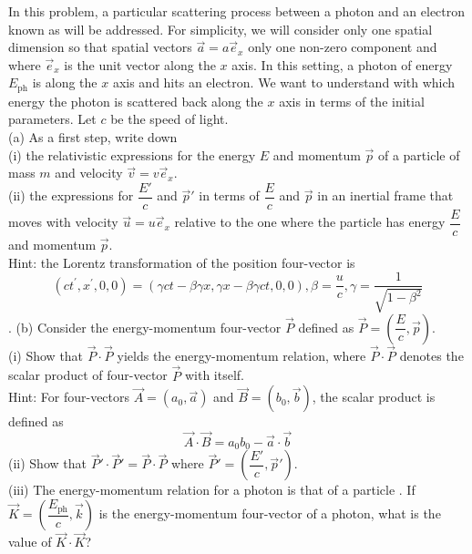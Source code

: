 \begin{example}
    In this problem, a particular scattering process between a photon and an electron known as  will be addressed. For simplicity, we will consider only one spatial dimension so that spatial vectors $\vec{a}=a\vec{e}_x$   only one non-zero component and where $\vec{e}_x$ is the unit vector along the $x$ axis. In this setting, a photon of energy $E_\mathrm{ph}$ is  along the $x$ axis and hits an electron. We want to understand with which energy the photon is scattered back along the $x$ axis in terms of the initial parameters. Let $c$ be the speed of light.
\\(a) As a first step, write down
\\\hspace*{2em}(i) the relativistic expressions for the energy $E$ and momentum $\vec{p}$ of a particle of mass $m$ and velocity $\vec{v} = v\vec{e}_x$.
\\\hspace*{2em}(ii) the expressions for $\dfrac{E'}{c}$ and $\vec{p}'$ in terms of $\dfrac{E}{c}$ and $\vec{p}$ in an inertial frame that moves with
velocity $\vec{u}=u\vec{e}_{x}$ relative to the one where the particle has energy $\dfrac{E}{c}$ and momentum $\vec{p}$.\\
Hint: the Lorentz transformation of the position four-vector is \[(ct^{\prime},x^{\prime},0,0)=(\gamma ct-\beta\gamma x,\gamma x-\beta \gamma ct, 0, 0), \beta = \dfrac{u}{c}, \gamma = \dfrac{1}{\sqrt {1- \beta ^2}}\]. 
(b) Consider the energy-momentum four-vector $\vec{P}$ defined as $\vec{P}=(\dfrac{E}{c},\vec{p})$.\\
\hspace*{2em}(i) Show that $\vec{P}\cdot\vec{P}$ yields the energy-momentum relation, where $\vec{P}\cdot\vec{P}$ denotes the scalar product of four-vector $\vec{P}$ with itself.\\ Hint: For four-vectors $\vec{A}=(a_0,\vec{a})$ and $\vec{B}=(b_0,\vec{b})$, the scalar product is defined as  \[\vec{A}\cdot\vec{B}=a_{0}b_{0}-\vec{a}\cdot\vec{b}\]
\hspace*{2em}(ii) Show that $\vec{P}'\cdot\vec{P}'=\vec{P}\cdot\vec{P}$ where $\vec{P}'=(\dfrac{E'}{c},\vec{p}')$.\\
\hspace*{2em}(iii) The energy-momentum relation for a photon is that of a particle . If $\vec{K} = ( \dfrac{E_{\mathrm{ph}}}{c}, \vec{k} )$ is the energy-momentum four-vector of a photon, what is the value of $\vec{K}\cdot\vec{K}$?\\

\end{example}
